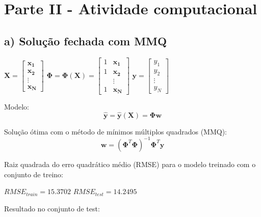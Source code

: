\documentclass[a4paper, 12pt]{article}
\begin{document}
\newpage

\section*{Parte II - Atividade computacional}

\subsection*{a) Solução fechada com MMQ}

$
\mathbf{X} =\begin{bmatrix}
    \mathbf{x_1} \\
    \mathbf{x_2} \\
    \vdots \\
    \mathbf{x_N}
\end{bmatrix}
$
\hspace{2em}
$
\boldsymbol{\Phi} = \boldsymbol{\Phi}(\mathbf{X}) = \begin{bmatrix}
    1 & \mathbf{x_1} \\
    1 & \mathbf{x_2} \\
    &\vdots \\
    1 & \mathbf{x_N}
\end{bmatrix}
$
\hspace{2em}
$
\mathbf{y} =\begin{bmatrix}
    y_1 \\
    y_2 \\
    \vdots \\
    y_N
\end{bmatrix}
$

\vspace{1em}

Modelo:
\begin{equation}
    \mathbf{\hat{y}} = \mathbf{\hat{y}}(\mathbf{X}) = \boldsymbol{\Phi}\mathbf{w}
\end{equation}

Solução ótima com o método de mínimos múltiplos quadrados (MMQ):
\begin{equation}
    \mathbf{w} = (\boldsymbol{\Phi}^T\boldsymbol{\Phi})^{-1}\boldsymbol{\Phi}^T\mathbf{y}
\end{equation}

Raiz quadrada do erro quadrático médio (RMSE) para o modelo treinado com o conjunto de treino:

$ RMSE _{train} = 15.3702$
\hspace{2em}
$ RMSE _{test} = 14.2495$

Resultado no conjunto de test:
\end{document}
